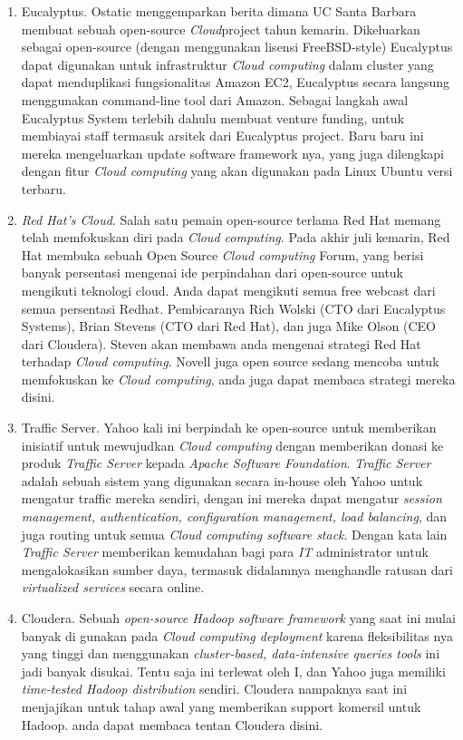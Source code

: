 \begin{enumerate}
\item Eucalyptus. Ostatic menggemparkan berita dimana UC Santa Barbara membuat sebuah open-source \textit{Cloud}project tahun kemarin. Dikeluarkan sebagai open-source (dengan menggunakan lisensi FreeBSD-style) Eucalyptus dapat digunakan untuk infrastruktur \textit{Cloud computing} dalam cluster yang dapat menduplikasi fungsionalitas Amazon EC2, Eucalyptus secara langsung menggunakan command-line tool dari Amazon. Sebagai langkah awal Eucalyptus System terlebih dahulu membuat venture funding, untuk  membiayai  staff termasuk arsitek dari Eucalyptus project. Baru baru ini mereka mengeluarkan update software framework nya, yang juga dilengkapi dengan fitur \textit{Cloud computing} yang akan digunakan pada Linux Ubuntu versi terbaru.
\item \textit{Red Hat's Cloud}. Salah satu pemain open-source terlama Red Hat memang telah memfokuskan diri pada \textit{Cloud computing}. Pada akhir juli kemarin,  Red  Hat  membuka sebuah Open Source \textit{Cloud computing} Forum, yang berisi banyak persentasi mengenai ide perpindahan dari open-source untuk mengikuti teknologi cloud.  Anda  dapat  mengikuti  semua free webcast dari semua persentasi Redhat. Pembicaranya Rich Wolski (CTO dari Eucalyptus Systems), Brian Stevens (CTO dari Red Hat), dan juga Mike Olson (CEO dari Cloudera). Steven akan membawa anda mengenai strategi Red Hat terhadap \textit{Cloud computing}. Novell juga open source sedang mencoba untuk memfokuskan ke \textit{Cloud computing}, anda juga dapat  membaca strategi mereka disini.
\item Traffic Server. Yahoo kali ini berpindah ke open-source untuk memberikan inisiatif untuk mewujudkan \textit{Cloud computing} dengan memberikan donasi ke produk \textit{Traffic Server} kepada \textit{Apache Software Foundation}. \textit{Traffic Server} adalah sebuah sistem yang digunakan secara in-house oleh Yahoo untuk mengatur traffic mereka sendiri, dengan ini mereka dapat mengatur \textit{session management, authentication, configuration management, load balancing}, dan juga routing untuk semua \textit{Cloud computing software stack}. Dengan kata lain \textit{Traffic Server} memberikan kemudahan bagi para \textit{IT} administrator untuk mengalokasikan sumber daya, termasuk didalamnya menghandle ratusan dari \textit{virtualized services} secara online.
\item Cloudera. Sebuah \textit{open-source Hadoop software framework} yang saat ini mulai banyak di gunakan pada \textit{Cloud computing deployment} karena fleksibilitas nya yang tinggi dan menggunakan \textit{cluster-based, data-intensive queries tools }ini jadi banyak disukai. Tentu saja ini terlewat oleh I, dan Yahoo juga memiliki \textit{time-tested Hadoop distribution} sendiri. Cloudera nampaknya saat ini menjajikan untuk tahap awal yang memberikan support komersil  untuk Hadoop. anda dapat  membaca tentan Cloudera disini.

\end{enumerate}

